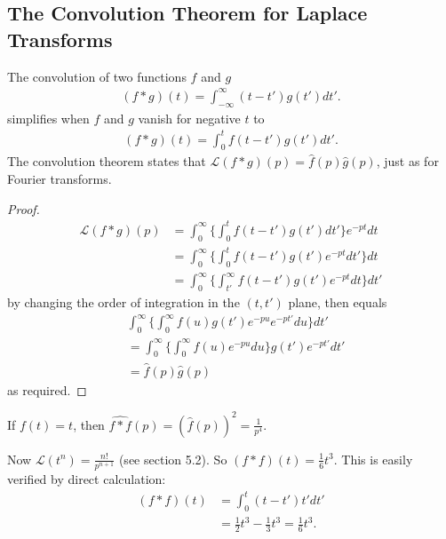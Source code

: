 \documentclass[a4paper]{article}
\begin{document}
\subsection{The Convolution Theorem for Laplace Transforms}
The convolution of two functions $f$ and $g$
\begin{equation*}
\begin{aligned}
(f*g)(t) = \int_{-\infty}^\infty (t-t') g(t') dt'.
\end{aligned}
\end{equation*}
simplifies when $f$ and $g$ vanish for negative $t$ to
\begin{equation*}
\begin{aligned}
(f*g)(t) = \int_0^t f(t-t') g(t') dt'.
\end{aligned}
\end{equation*}
The convolution theorem states that $\mathcal{L}(f*g) (p) = \hat{f}(p) \hat{g}(p)$, just as for Fourier transforms.
\begin{proof}
\begin{equation*}
\begin{aligned}
\mathcal{L}(f*g) (p) &= \int_0^\infty \{\int_0^t f(t-t') g(t') dt' \} e^{-pt} dt\\
&= \int_0^\infty \{ \int_0^t f(t-t') g(t') e^{-pt} dt'\} dt\\
&= \int_0^\infty \{ \int_{t'}^\infty f(t-t') g(t') e^{-pt} dt\} dt'
\end{aligned}
\end{equation*}
by changing the order of integration in the $(t,t')$ plane, then equals
\begin{equation*}
\begin{aligned}
&\int_0^\infty \{ \int_0^\infty f(u) g(t') e^{-pu} e^{-pt'} du\} dt'\\
&= \int_0^\infty \{ \int_0^\infty f(u) e^{-pu} du\} g(t') e^{-pt'} dt'\\
&= \hat{f}(p) \hat{g}(p)
\end{aligned}
\end{equation*}
as required.
\end{proof}

\begin{eg}
If $f(t) = t$, then $\widehat{f*f} (p) = (\hat{f}(p))^2 = \frac{1}{p^4}$.

Now $\mathcal{L}(t^n) = \frac{n!}{p^{n+1}}$ (see section 5.2). So $(f*f) (t) = \frac{1}{6} t^3$. This is easily verified by direct calculation:
\begin{equation*}
\begin{aligned}
(f*f) (t) &= \int_0^t (t-t') t' dt'\\
&= \frac{1}{2} t^3 - \frac{1}{3}t^3 = \frac{1}{6}t^3.
\end{aligned}
\end{equation*}
\end{eg}
\end{document}

